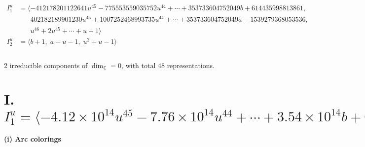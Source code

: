\documentclass[1p]{elsarticle_modified}
\theoremstyle{definition}
\begin{document}
\begin{align*}
I^u_{1}&=\langle 
-412178201122641 u^{45}-775553559035752 u^{44}+\cdots+353733604752049 b+614435998813861,\\
\phantom{I^u_{1}}&\phantom{= \langle  }402182189901230 u^{45}+1007252468993735 u^{44}+\cdots+353733604752049 a-1539279368053536,\\
\phantom{I^u_{1}}&\phantom{= \langle  }u^{46}+2 u^{45}+\cdots+u+1\rangle \\
I^u_{2}&=\langle 
b+1,\;a- u-1,\;u^2+u-1\rangle \\
\\
\end{align*}
\raggedright * 2 irreducible components of $\dim_{\mathbb{C}}=0$, with total 48 representations.\\
\newpage
\renewcommand{\arraystretch}{1}
\centering \section*{I. $I^u_{1}= \langle -4.12\times10^{14} u^{45}-7.76\times10^{14} u^{44}+\cdots+3.54\times10^{14} b+6.14\times10^{14},\;4.02\times10^{14} u^{45}+1.01\times10^{15} u^{44}+\cdots+3.54\times10^{14} a-1.54\times10^{15},\;u^{46}+2 u^{45}+\cdots+u+1 \rangle$}
\flushleft \textbf{(i) Arc colorings}\\
\end{document}
